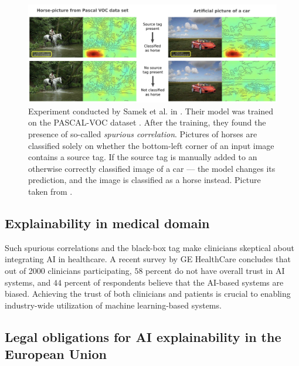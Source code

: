 \begin{figure}[!h]
    \begin{center}
    \begin{minipage}{1\textwidth}
      \includegraphics[width=\textwidth]{img/horse-tag.png}
    \end{minipage}
    \caption{Experiment conducted by Samek et al. in \cite{xai-horse}. Their model was trained on the PASCAL-VOC dataset \cite{pascal-voc}. After the training, they found the presence of so-called \emph{spurious correlation}. Pictures of horses are classified solely on whether the bottom-left corner of an input image contains a source tag. If the source tag is manually added to an otherwise correctly classified image of a car --- the model changes its prediction, and the image is classified as a horse instead. Picture taken from \cite{xai-horse}.}
    \label{fig:horse-tag}
    \end{center}

\end{figure}

\subsection*{Explainability in medical domain}

Such spurious correlations and the black-box tag make clinicians skeptical about integrating AI in healthcare.
A recent survey by GE HealthCare \cite{ge-healthcare-survey} concludes that out of 2000 clinicians participating, $58$ percent do not have overall trust in AI systems, and $44$ percent of respondents believe that the AI-based systems are biased.
Achieving the trust of both clinicians and patients is crucial to enabling industry-wide utilization of machine learning-based systems.

\subsection*{Legal obligations for AI explainability in the European Union}

